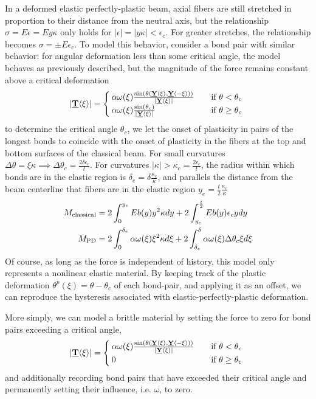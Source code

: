 In a deformed elastic perfectly-plastic beam, axial fibers are still stretched in proportion to their distance from the neutral axis, but the relationship \(\sigma = E\epsilon = Ey\kappa\) only holds for \(|\epsilon| = |y\kappa| < \epsilon_c\). 
For greater stretches, the relationship becomes \(\sigma = \pm E\epsilon_c \). 
To model this behavior, consider a bond pair with similar behavior: for angular deformation less than some critical angle, the model behaves as previously described, but the magnitude of the force remains constant above a critical deformation
%
\begin{equation}
|\vstate{T}{}{\xi}| = 
  \begin{cases}
    \alpha \omega(\xi) \frac{\sin(\theta(\vstate{Y}{}{\xi},\vstate{Y}{}{\mathbf{-\xi}}))}{|\vstate{Y}{}{\xi}|} & \quad \text{if } \theta < \theta_c\\
    \alpha \omega(\xi) \frac{\sin(\theta_c)}{|\vstate{Y}{}{\xi}|} & \quad \text{if } \theta \geq \theta_c\
  \end{cases}
  \label{eq:epp_force}
\end{equation}
%
to determine the critical angle \(\theta_c\), we let the onset of plasticity in pairs of the longest bonds to coincide with the onset of plasticity in the fibers at the top and bottom surfaces of the classical beam. 
For small curvatures \(\Delta\theta = \xi\kappa\implies\Delta\theta_c = \frac{2\delta\epsilon_c}{t}\). 
For curvatures \(|\kappa| > \kappa_c=\frac{2\epsilon_c}{t}\), the radius within which bonds are in the elastic region is \(\delta_e = \delta \frac{\kappa_c}{\kappa}\), and parallels the distance from the beam centerline that fibers are in the elastic region \(y_e = \frac{t}{2} \frac{\kappa_c}{\kappa}\)
%
\begin{align}
  M_\text{classical} &= 2 \int_{0}^{y_e}E b(y)y^2 \kappa dy +2 \int_{y_e}^{\frac{t}{2}}E b(y) \epsilon_c y dy\notag \\
  M_\text{PD} &= 2 \int_{0}^{\delta_e}\alpha \omega(\xi) \xi^2 \kappa d\xi +2 \int_{\delta_e}^{\delta}\alpha \omega(\xi) \Delta\theta_c \xi d\xi \notag
\end{align}
%
Of course, as long as the force is independent of history, this model only represents a nonlinear elastic material. 
By keeping track of the plastic deformation \(\theta^p (\xi) = \theta-\theta_c\) of each bond-pair, and applying it as an offset, we can reproduce the hysteresis associated with elastic-perfectly-plastic deformation.

More simply, we can model a brittle material by setting the force to zero for bond pairs exceeding a critical angle,
%
\begin{equation}
|\vstate{T}{}{\xi}| = 
  \begin{cases}
    \alpha \omega(\xi) \frac{\sin(\theta(\vstate{Y}{}{\xi},\vstate{Y}{}{\mathbf{-\xi}}))}{|\vstate{Y}{}{\xi}|} & \quad \text{if } \theta < \theta_c\\
    0 & \quad \text{if } \theta \geq \theta_c\
  \end{cases}
  \label{eq:brittle_force}
\end{equation}
%
and additionally recording bond pairs that have exceeded their critical angle and permanently setting their influence, i.e. $\omega$, to zero.
%
%
